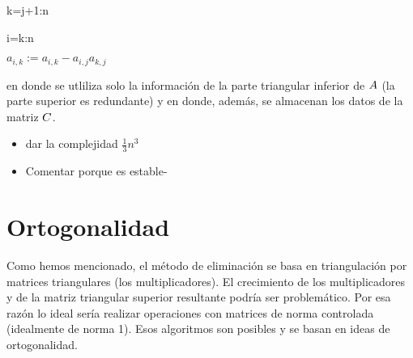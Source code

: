 \begin{tcolorbox}
 k=j+1:n

\qquad\qquad{} i=k:n

\qquad\qquad\qquad    $a_{i,k}:=a_{i,k}-a_{i,j}a_{k,j}$

en donde se utliliza solo la información de la parte triangular  inferior de $\Ab$ (la parte superior es redundante) y en donde, además, se almacenan los datos de la matriz $\Cb$.


\begin{itemize}

 \item dar  la complejidad $\frac{1}{3}n^3$
 \item Comentar porque es estable-
\end{itemize}



\section{Ortogonalidad}

\begin{tcolorbox}
Como hemos mencionado, el método de eliminación se basa en triangulación por matrices triangulares (los multiplicadores).
El crecimiento de los  multiplicadores y de la matriz triangular superior resultante podría ser problemático.  Por esa razón lo ideal sería realizar operaciones con matrices de norma controlada (idealmente de norma 1). Esos algoritmos son posibles y se basan en ideas de ortogonalidad.
\end{tcolorbox}



\end{tcolorbox}
